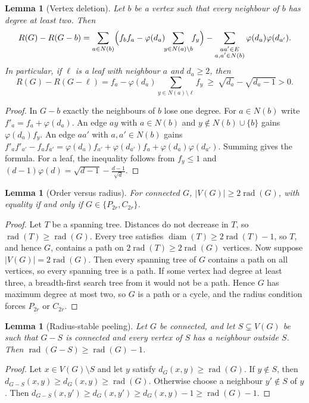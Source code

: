 \documentclass[11pt,a4paper]{article}
\newtheorem{lemma}[theorem]{Lemma}
\theoremstyle{definition}
\newcommand{\rad}{\operatorname{rad}}
\newcommand{\diam}{\operatorname{diam}}
\begin{document}
\begin{lemma}[Vertex deletion]\label{lem:vertex}
Let $b$ be a vertex such that every neighbour of $b$ has degree at least two. Then
\[
R(G)-R(G-b)=\sum_{a\in N(b)}\Bigl(f_bf_a-\varphi(d_a)\!\!\sum_{y\in N(a)\setminus b}\!\!f_y\Bigr)-\sum_{\substack{aa'\in E\\ a,a'\in N(b)}}\varphi(d_a)\varphi(d_{a'}).
\]
In particular, if $\ell$ is a leaf with neighbour $a$ and $d_a\ge2$, then
\[
R(G)-R(G-\ell)=f_a-\varphi(d_a)\sum_{y\in N(a)\setminus\ell}f_y\ \ge\ \sqrt{d_a}-\sqrt{d_a-1}>0 .
\]
\end{lemma}
\begin{proof}
In $G-b$ exactly the neighbours of $b$ lose one degree. For $a\in N(b)$ write $f'_a=f_a+\varphi(d_a)$. An edge $ay$ with $a\in N(b)$ and $y\notin N(b)\cup\{b\}$ gains $\varphi(d_a)f_y$. An edge $aa'$ with $a,a'\in N(b)$ gains $f'_af'_{a'}-f_af_{a'}=\varphi(d_a)f_{a'}+\varphi(d_{a'})f_a+\varphi(d_a)\varphi(d_{a'})$. Summing gives the formula. For a leaf, the inequality follows from $f_y\le1$ and $(d-1)\varphi(d)=\sqrt{d-1}-\frac{d-1}{\sqrt d}$.
\end{proof}

\begin{lemma}[Order versus radius]\label{lem:2r}
For connected $G$, $|V(G)|\ge2\rad(G)$, with equality if and only if $G\in\{P_{2r},C_{2r}\}$.
\end{lemma}
\begin{proof}
Let $T$ be a spanning tree. Distances do not decrease in $T$, so $\rad(T)\ge\rad(G)$. Every tree satisfies $\diam(T)\ge2\rad(T)-1$, so $T$, and hence $G$, contains a path on $2\rad(T)\ge2\rad(G)$ vertices. Now suppose $|V(G)|=2\rad(G)$. Then every spanning tree of $G$ contains a path on all vertices, so every spanning tree is a path. If some vertex had degree at least three, a breadth-first search tree from it would not be a path. Hence $G$ has maximum degree at most two, so $G$ is a path or a cycle, and the radius condition forces $P_{2r}$ or $C_{2r}$.
\end{proof}

\begin{lemma}[Radius-stable peeling]\label{lem:peel}
Let $G$ be connected, and let $S\subsetneq V(G)$ be such that $G-S$ is connected and every vertex of $S$ has a neighbour outside $S$. Then $\rad(G-S)\ge\rad(G)-1$.
\end{lemma}
\begin{proof}
Let $x\in V(G)\setminus S$ and let $y$ satisfy $d_G(x,y)\ge\rad(G)$. If $y\notin S$, then $d_{G-S}(x,y)\ge d_G(x,y)\ge\rad(G)$. Otherwise choose a neighbour $y'\notin S$ of $y$. Then $d_{G-S}(x,y')\ge d_G(x,y')\ge d_G(x,y)-1\ge\rad(G)-1$.
\end{proof}
\end{document}
